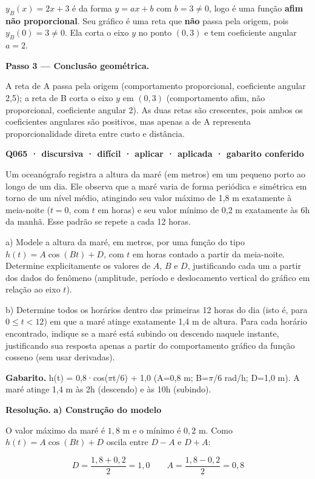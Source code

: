 $y_B(x) = 2x+3$ é da forma $y = ax+b$ com $b = 3 \neq 0$, logo é uma função \textbf{afim não proporcional}. Seu gráfico é uma reta que \textbf{não} passa pela origem, pois $y_B(0) = 3 \neq 0$. Ela corta o eixo $y$ no ponto $(0,3)$ e tem coeficiente angular $a = 2$.

\textbf{Passo 3 — Conclusão geométrica.}

A reta de A passa pela origem (comportamento proporcional, coeficiente angular 2,5); a reta de B corta o eixo $y$ em $(0,3)$ (comportamento afim, não proporcional, coeficiente angular 2). As duas retas são crescentes, pois ambos os coeficientes angulares são positivos, mas apenas a de A representa proporcionalidade direta entre custo e distância.

\bigskip\noindent\textbf{Q065 · discursiva · difícil · aplicar · aplicada · gabarito conferido}\par\nopagebreak
Um oceanógrafo registra a altura da maré (em metros) em um pequeno porto ao longo de um dia. Ele observa que a maré varia de forma periódica e simétrica em torno de um nível médio, atingindo seu valor máximo de 1,8 m exatamente à meia-noite ($t=0$, com $t$ em horas) e seu valor mínimo de 0,2 m exatamente às 6h da manhã. Esse padrão se repete a cada 12 horas.

a) Modele a altura da maré, em metros, por uma função do tipo $h(t) = A\cos(Bt) + D$, com $t$ em horas contado a partir da meia-noite. Determine explicitamente os valores de $A$, $B$ e $D$, justificando cada um a partir dos dados do fenômeno (amplitude, período e deslocamento vertical do gráfico em relação ao eixo $t$).

b) Determine todos os horários dentro das primeiras 12 horas do dia (isto é, para $0 \le t < 12$) em que a maré atinge exatamente 1,4 m de altura. Para cada horário encontrado, indique se a maré está subindo ou descendo naquele instante, justificando sua resposta apenas a partir do comportamento gráfico da função cosseno (sem usar derivadas).

\textbf{Gabarito.} h(t) = 0,8·cos($\pi$t/6) + 1,0 (A=0,8 m; B=$\pi$/6 rad/h; D=1,0 m). A maré atinge 1,4 m às 2h (descendo) e às 10h (subindo).

\textbf{Resolução.} \textbf{a) Construção do modelo}

O valor máximo da maré é $1{,}8$ m e o mínimo é $0{,}2$ m. Como $h(t)=A\cos(Bt)+D$ oscila entre $D-A$ e $D+A$:

$$D = \frac{1{,}8+0{,}2}{2} = 1{,}0 \qquad A = \frac{1{,}8-0{,}2}{2} = 0{,}8$$

